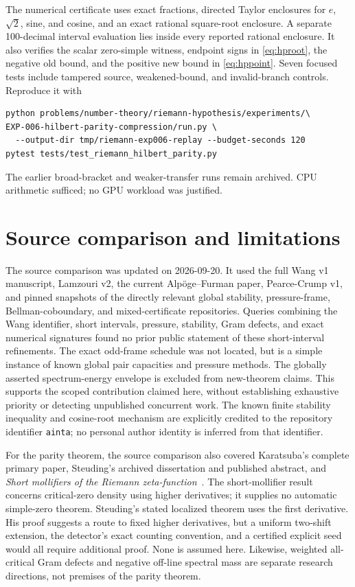 \documentclass[11pt]{article}
\theoremstyle{remark}
\begin{document}
The numerical certificate uses exact fractions, directed Taylor enclosures
for $e$, $\sqrt2$, sine, and cosine, and an exact rational square-root
enclosure. A separate 100-decimal interval evaluation lies inside every
reported rational enclosure. It also verifies the scalar zero-simple witness,
endpoint signs in \eqref{eq:hproot}, the negative old bound, and the positive
new bound in \eqref{eq:hppoint}. Seven focused tests include tampered source,
weakened-bound, and invalid-branch controls. Reproduce it with
\begin{verbatim}
python problems/number-theory/riemann-hypothesis/experiments/\
EXP-006-hilbert-parity-compression/run.py \
  --output-dir tmp/riemann-exp006-replay --budget-seconds 120
pytest tests/test_riemann_hilbert_parity.py
\end{verbatim}
The earlier broad-bracket and weaker-transfer runs remain archived. CPU
arithmetic sufficed; no GPU workload was justified.

\section{Source comparison and limitations}

The source comparison was updated on 2026-09-20. It used the full
Wang v1 manuscript, Lamzouri v2, the current Alp\"oge--Furman paper,
Pearce-Crump v1,
and pinned snapshots of the directly relevant global stability,
pressure-frame, Bellman-coboundary, and mixed-certificate repositories.
Queries combining the Wang identifier, short intervals, pressure,
stability, Gram defects, and exact numerical signatures found no prior
public statement of these short-interval refinements. The exact odd-frame
schedule was not located, but is a simple instance of known global pair
capacities and pressure methods. The globally asserted spectrum-energy
envelope is excluded from new-theorem claims. This supports the
scoped contribution claimed here, without establishing exhaustive
priority or detecting unpublished concurrent work. The known finite
stability inequality and cosine-root mechanism are explicitly credited
to the repository identifier \texttt{ainta}; no personal author identity
is inferred from that identifier.

For the parity theorem, the source comparison also covered Karatsuba's
complete primary paper, Steuding's archived dissertation and published
abstract, and
\emph{Short mollifiers of the Riemann zeta-function}~\cite{CFKL}.
The short-mollifier result concerns critical-zero density
using higher derivatives; it supplies no automatic simple-zero theorem.
Steuding's stated localized theorem uses the first derivative. His proof
suggests a route to fixed higher derivatives, but a uniform two-shift
extension, the detector's exact counting convention, and a certified
explicit seed would all require additional proof. None is assumed here.
Likewise, weighted all-critical Gram defects and negative off-line spectral
mass are separate research directions, not premises of the parity theorem.
\end{document}
